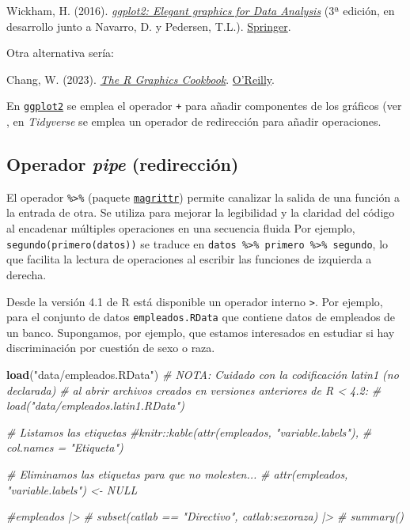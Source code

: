\documentclass[
]{book}
\newenvironment{Shaded}{\begin{snugshade}}{\end{snugshade}}
\newcommand{\CommentTok}[1]{\textcolor[rgb]{0.56,0.35,0.01}{\textit{#1}}}
\newcommand{\FunctionTok}[1]{\textcolor[rgb]{0.13,0.29,0.53}{\textbf{#1}}}
\newcommand{\NormalTok}[1]{#1}
\newcommand{\StringTok}[1]{\textcolor[rgb]{0.31,0.60,0.02}{#1}}
\begin{document}
Wickham, H. (2016). \emph{\href{https://ggplot2-book.org}{ggplot2: Elegant graphics for Data Analysis}} (3ª edición, en desarrollo junto a Navarro, D. y Pedersen, T.L.). \href{https://www.amazon.com/gp/product/331924275X}{Springer}.

Otra alternativa sería:

Chang, W. (2023). \emph{\href{https://r-graphics.org}{The R Graphics Cookbook}}. \href{https://www.amazon.com/dp/1491978600}{O'Reilly}.

En \href{https://ggplot2.tidyverse.org}{\texttt{ggplot2}} se emplea el operador \texttt{+} para añadir componentes de los gráficos (ver , en \emph{Tidyverse} se emplea un operador de redirección para añadir operaciones.

\subsection{\texorpdfstring{Operador \emph{pipe} (redirección)}{Operador pipe (redirección)}}\label{pipe}

El operador \texttt{\%\textgreater{}\%} (paquete \href{https://magrittr.tidyverse.org}{\texttt{magrittr}}) permite canalizar la salida de una función a la entrada de otra. Se utiliza para mejorar la legibilidad y la claridad del código al encadenar múltiples operaciones en una secuencia fluida
Por ejemplo, \texttt{segundo(primero(datos))} se traduce en \texttt{datos\ \%\textgreater{}\%\ primero\ \%\textgreater{}\%\ segundo}, lo que facilita la lectura de operaciones al escribir las funciones de izquierda a derecha.

Desde la versión 4.1 de R está disponible un operador interno \texttt{\textbar{}\textgreater{}}.
Por ejemplo, para el conjunto de datos \texttt{empleados.RData} que contiene datos de empleados de un banco. Supongamos, por ejemplo, que estamos interesados en estudiar si hay discriminación por cuestión de sexo o raza.

\begin{Shaded}
\begin{Highlighting}[]
\FunctionTok{load}\NormalTok{(}\StringTok{"data/empleados.RData"}\NormalTok{)}
\CommentTok{\# NOTA: Cuidado con la codificación latin1 (no declarada) }
\CommentTok{\# al abrir archivos creados en versiones anteriores de R \textless{} 4.2: }
\CommentTok{\# load("data/empleados.latin1.RData")}

\CommentTok{\# Listamos las etiquetas}
\CommentTok{\#knitr::kable(attr(empleados, "variable.labels"),}
\CommentTok{\#             col.names = "Etiqueta")}

\CommentTok{\# Eliminamos las etiquetas para que no molesten...}
\CommentTok{\# attr(empleados, "variable.labels") \textless{}{-} NULL  }

\CommentTok{\#empleados |\textgreater{}  }
\CommentTok{\#  subset(catlab == "Directivo", catlab:sexoraza) |\textgreater{}}
\CommentTok{\#  summary()}
\end{Highlighting}
\end{Shaded}
\end{document}
